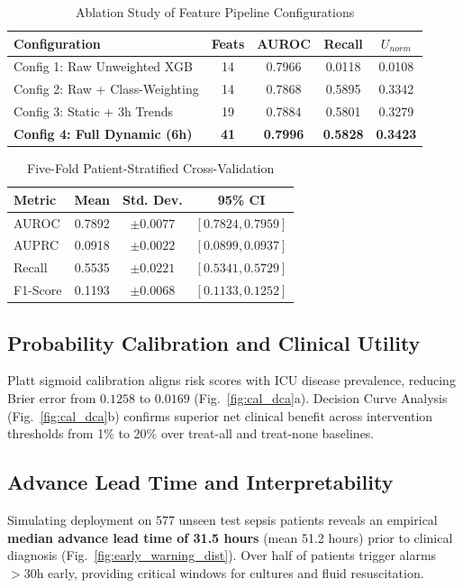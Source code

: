 \documentclass[conference]{IEEEtran}
\begin{document}
\begin{table}[t]
\caption{Ablation Study of Feature Pipeline Configurations}
\label{tab:ablation_results}
\centering
\small
\setlength{\tabcolsep}{3pt}
\begin{tabularx}{\columnwidth}{>{\raggedright\arraybackslash}X c c c c}
\toprule
\textbf{Configuration} & \textbf{Feats} & \textbf{AUROC} & \textbf{Recall} & \textbf{$U_{norm}$} \\
\midrule
Config 1: Raw Unweighted XGB & 14 & 0.7966 & 0.0118 & 0.0108 \\
Config 2: Raw + Class-Weighting & 14 & 0.7868 & 0.5895 & 0.3342 \\
Config 3: Static + 3h Trends & 19 & 0.7884 & 0.5801 & 0.3279 \\
\textbf{Config 4: Full Dynamic (6h)} & \textbf{41} & \textbf{0.7996} & \textbf{0.5828} & \textbf{0.3423} \\
\bottomrule
\end{tabularx}
\end{table}

\begin{table}[t]
\caption{Five-Fold Patient-Stratified Cross-Validation}
\label{tab:cv_results}
\centering
\small
\setlength{\tabcolsep}{4pt}
\begin{tabular}{lccc}
\toprule
\textbf{Metric} & \textbf{Mean} & \textbf{Std. Dev.} & \textbf{95\% CI} \\
\midrule
AUROC & 0.7892 & $\pm 0.0077$ & $[0.7824, 0.7959]$ \\
AUPRC & 0.0918 & $\pm 0.0022$ & $[0.0899, 0.0937]$ \\
Recall & 0.5535 & $\pm 0.0221$ & $[0.5341, 0.5729]$ \\
F1-Score & 0.1193 & $\pm 0.0068$ & $[0.1133, 0.1252]$ \\
\bottomrule
\end{tabular}
\end{table}

\subsection{Probability Calibration and Clinical Utility}
Platt sigmoid calibration aligns risk scores with ICU disease prevalence, reducing Brier error from $0.1258$ to $\mathbf{0.0169}$ (Fig.~\ref{fig:cal_dca}a). Decision Curve Analysis (Fig.~\ref{fig:cal_dca}b) confirms superior net clinical benefit across intervention thresholds from 1\% to 20\% over treat-all and treat-none baselines.

\subsection{Advance Lead Time and Interpretability}
Simulating deployment on 577 unseen test sepsis patients reveals an empirical \textbf{median advance lead time of 31.5 hours} (mean 51.2 hours) prior to clinical diagnosis (Fig.~\ref{fig:early_warning_dist}). Over half of patients trigger alarms $>30$h early, providing critical windows for cultures and fluid resuscitation.
\end{document}
